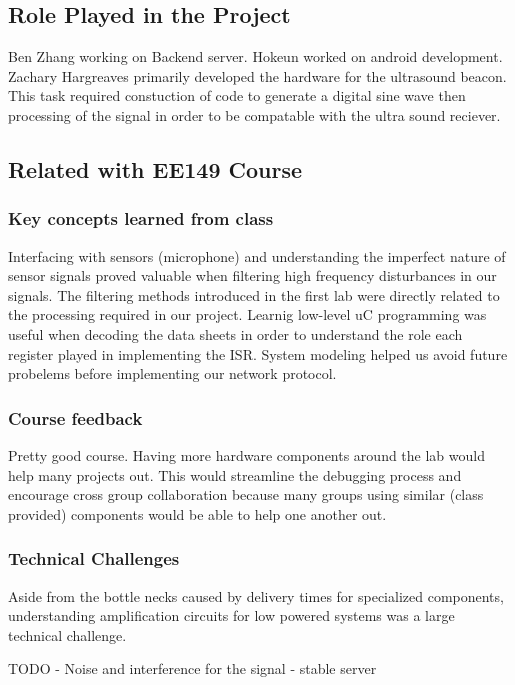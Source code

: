 \appendix

\subsection{Role Played in the Project}
\label{sec:role-played-project}
Ben Zhang working on Backend server.
Hokeun worked on android development.
Zachary Hargreaves primarily developed the hardware for the ultrasound beacon.  This task required constuction of code to generate a digital sine wave then processing of the signal in order to be compatable with the ultra sound reciever.   

\subsection{Related with EE149 Course}
\label{sec:related-with-ee149}
\subsubsection{Key concepts learned from class}
\label{sec:key-concepts-learned}

Interfacing with sensors (microphone) and understanding the imperfect nature of sensor signals proved valuable when filtering high frequency disturbances in our signals.  The filtering methods introduced in the first lab were directly related to the processing required in our project.  Learnig low-level uC programming was useful when decoding the data sheets in order to understand the role each register played in implementing the ISR.  System modeling helped us avoid future probelems before implementing our network protocol.

\subsubsection{Course feedback}
\label{sec:course-feedback}
Pretty good course. Having more hardware components around the lab would help many projects out. This would streamline the debugging process and encourage cross group collaboration because many groups using similar (class provided) components would be able to help one another out.  

\subsubsection{Technical Challenges}
\label{sec:technical-challenges}
Aside from the bottle necks caused by delivery times for specialized components, understanding amplification circuits for low powered systems was a large technical challenge.

TODO
 - Noise and interference for the signal   
- stable server 

